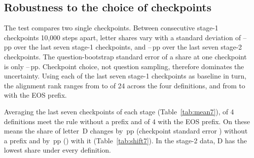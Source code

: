 \documentclass[11pt,a4paper]{article}
\newcommand{\pp}{\,pp}
\begin{document}
\begin{table}[t]
\centering\small
\setlength{\tabcolsep}{4pt}
\resizebox{\linewidth}{!}{}
\caption{Pre-declared test (letters, shuffled condition). $\Delta d$: change in data share from stage~1 to stage~2. Rank: rank of the observed alignment among the 24 label permutations (1 is required for ``matched''). $\beta$: fraction of the data shift reproduced by the model, with a question-bootstrap 95\% interval. $r$: Pearson correlation of $\Delta m$ and $\Delta d$ over the four letters. All eight cells: did not match.}\label{tab:locked}
\end{table}

\subsection{Robustness to the choice of checkpoints}
The test compares two single checkpoints. Between consecutive stage-1 checkpoints 10{,}000 steps apart, letter shares vary with a standard deviation of \SdStageOneMin--\SdStageOneMax\pp{} over the last seven stage-1 checkpoints, and \SdStageTwoMin--\SdStageTwoMax\pp{} over the last seven stage-2 checkpoints. The question-bootstrap standard error of a share at one checkpoint is only \QSeMin--\QSeMax\pp. Checkpoint choice, not question sampling, therefore dominates the uncertainty. Using each of the last seven stage-1 checkpoints as baseline in turn, the alignment rank ranges from \RankSingleMin{} to \RankSingleMax{} of 24 across the four definitions, and from \RankSingleEosMin{} to \RankSingleEosMax{} with the EOS prefix.

Averaging the last seven checkpoints of each stage (Table~\ref{tab:mean7}), \NMeanMatchedNone{} of 4 definitions meet the rule without a prefix and \NMeanMatchedEos{} of 4 with the EOS prefix. On these means the share of letter~D changes by \MeanShiftD\pp{} (checkpoint standard error \MeanShiftSeD) without a prefix and by \MeanShiftEosD\pp{} (\MeanShiftEosSeD) with it (Table~\ref{tab:shift7}). In the stage-2 data, D has the lowest share under every definition.

\begin{table}[t]
\centering\small

\caption{Pre-declared rule applied to means of the last seven stage-1 and last seven stage-2 (ingredient~3) checkpoints.}\label{tab:mean7}
\end{table}

\begin{table}[t]
\centering\small

\caption{Checkpoint-averaged letter shares and shift. SE is computed from the between-checkpoint standard deviations and assumes independent checkpoints; neighbouring checkpoints are probably correlated, so it may be too small.}\label{tab:shift7}
\end{table}
\end{document}
